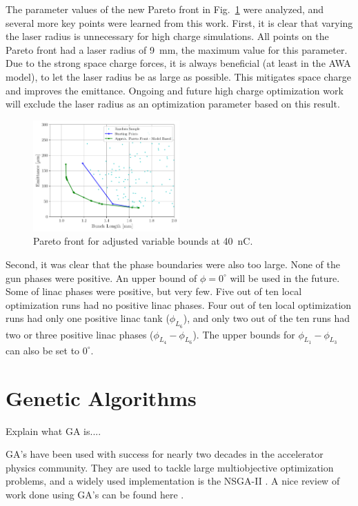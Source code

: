 \documentclass[letterpaper,  %
              ]{jacow-2_3}   %
\begin{document}
The parameter values of the new Pareto front in Fig.~\ref{paretob} were analyzed, and 
several more key points were learned from this work. 
First, it is clear that varying the laser radius is unnecessary for 
high charge simulations. All points on the Pareto front
had a laser radius of \SI{9}{mm}, the maximum value for this parameter.
Due to the strong space charge forces, 
it is always beneficial (at least in the AWA model), to let the 
laser radius be as large as possible.  This mitigates space charge
and improves the emittance. Ongoing and future high charge optimization work will exclude the laser radius as an optimization parameter based on 
this result.
\begin{figure}
	\includegraphics[width=0.5\textwidth]{pareto_emittance_vs_zrms}
	\caption{Pareto front for adjusted variable bounds at \SI{40}{nC}. }
	\label{paretob}
\end{figure}

Second, it was clear that the phase boundaries were also too large.
None of the gun phases were positive. An upper bound of $\phi = 0^{\circ}$
will be used in the future. Some of linac phases were positive, 
but very few. Five out of ten local optimization runs had no positive linac 
phases. Four out of ten local optimization runs had only one positive 
linac tank ($\phi_{L_6}$), and only two out of the ten runs had two or three
positive linac phases ($\phi_{L_4}-\phi_{L_6}$). The upper bounds for 
$\phi_{L_1}-\phi_{L_3}$ can also be set to $0^{\circ}$. 


\section{Genetic Algorithms}
Explain what GA is....


GA's have been used with success for nearly two decades
in the accelerator physics community.
They are used to tackle large multiobjective optimization problems, 
and a widely used implementation is the NSGA-II \cite{nsgaii}.
A nice review of work done using GA's can be found here \cite{hofler}. 
\end{document}
